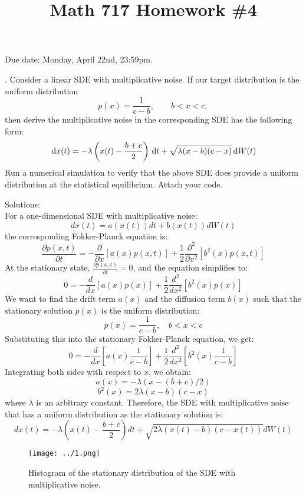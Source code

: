 \documentclass[a4paper,notitlepage,cs4size,cap,indent,oneside,12pt]{article}
\title{Math 717 Homework \#4}
\author{}
\date{}
\numberwithin{equation}{section}
\numberwithin{figure}{section}
\newcommand{\blue}{\color{blue}}
\begin{document}
\maketitle%
Due date: Monday, April 22nd, 23:59pm.\medskip

. Consider a linear SDE with multiplicative noise. If our target distribution is the uniform distribution
\begin{equation*}
p(x) = \frac{1}{c-b},\qquad b<x<c,
\end{equation*}
then derive the multiplicative noise in the corresponding SDE has the following form:
\begin{equation*}
{\, \rm d} x(t) = -\lambda \left(x(t) - \frac{b+c}{2}\right){\, \rm d} t + \sqrt{\lambda (x-b)(c-x)}{\, \rm d} W(t)
\end{equation*}
Run a numerical simulation to verify that the above SDE does provide a uniform distribution at the statistical equilibrium. Attach your code.\medskip\medskip \\
{\blue
\noindent Solutions: \\
For a one-dimensional SDE with multiplicative noise:
$$dx(t) = a(x(t))dt + b(x(t))dW(t)$$
the corresponding Fokker-Planck equation is:
$$\frac{\partial p(x,t)}{\partial t} = -\frac{\partial}{\partial x}[a(x)p(x,t)] + \frac{1}{2}\frac{\partial^2}{\partial x^2}[b^2(x)p(x,t)]$$
At the stationary state, $\frac{\partial p(x,t)}{\partial t} = 0$, and the equation simplifies to:
$$0 = -\frac{d}{dx}[a(x)p(x)] + \frac{1}{2}\frac{d^2}{dx^2}[b^2(x)p(x)]$$
We want to find the drift term $a(x)$ and the diffusion term $b(x)$ such that the stationary solution $p(x)$ is the uniform distribution:
$$p(x) = \frac{1}{c-b}, \quad b < x < c$$
Substituting this into the stationary Fokker-Planck equation, we get:
$$0 = -\frac{d}{dx}\left[a(x)\frac{1}{c-b}\right] + \frac{1}{2}\frac{d^2}{dx^2}\left[b^2(x)\frac{1}{c-b}\right]$$
Integrating both sides with respect to $x$, we obtain:
$$a(x) = -\lambda(x - (b+c)/2)$$
$$b^2(x) = 2\lambda(x-b)(c-x)$$
where $\lambda$ is an arbitrary constant.
Therefore, the SDE with multiplicative noise that has a uniform distribution as the stationary solution is:
$$dx(t) = -\lambda\left(x(t) - \frac{b+c}{2}\right)dt + \sqrt{2\lambda(x(t)-b)(c-x(t))}dW(t)$$

\begin{figure}[htbp]
  \centering
  \texttt{[image: ../1.png]}
  \caption{Histogram of the stationary distribution of the SDE with multiplicative noise.}
  \label{fig:hist}
\end{figure}
}
\end{document}
